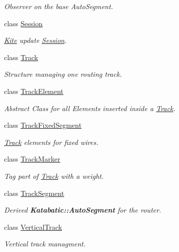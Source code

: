 \begin{DoxyCompactItemize}
\begin{DoxyCompactList}\small\item\em Observer on the base Auto\+Segment. \end{DoxyCompactList}\item 
class \mbox{\hyperlink{classKite_1_1Session}{Session}}
\begin{DoxyCompactList}\small\item\em \mbox{\hyperlink{namespaceKite}{Kite}} update \mbox{\hyperlink{classKite_1_1Session}{Session}}. \end{DoxyCompactList}\item 
class \mbox{\hyperlink{classKite_1_1Track}{Track}}
\begin{DoxyCompactList}\small\item\em Structure managing one routing track. \end{DoxyCompactList}\item 
class \mbox{\hyperlink{classKite_1_1TrackElement}{Track\+Element}}
\begin{DoxyCompactList}\small\item\em Abstract Class for all Elements inserted inside a \mbox{\hyperlink{classKite_1_1Track}{Track}}. \end{DoxyCompactList}\item 
class \mbox{\hyperlink{classKite_1_1TrackFixedSegment}{Track\+Fixed\+Segment}}
\begin{DoxyCompactList}\small\item\em \mbox{\hyperlink{classKite_1_1Track}{Track}} elements for fixed wires. \end{DoxyCompactList}\item 
class \mbox{\hyperlink{classKite_1_1TrackMarker}{Track\+Marker}}
\begin{DoxyCompactList}\small\item\em Tag part of \mbox{\hyperlink{classKite_1_1Track}{Track}} with a weight. \end{DoxyCompactList}\item 
class \mbox{\hyperlink{classKite_1_1TrackSegment}{Track\+Segment}}
\begin{DoxyCompactList}\small\item\em Derived \textbf{ Katabatic\+::\+Auto\+Segment} for the router. \end{DoxyCompactList}\item 
class \mbox{\hyperlink{classKite_1_1VerticalTrack}{Vertical\+Track}}
\begin{DoxyCompactList}\small\item\em Vertical track managment. \end{DoxyCompactList}\end{DoxyCompactItemize}
